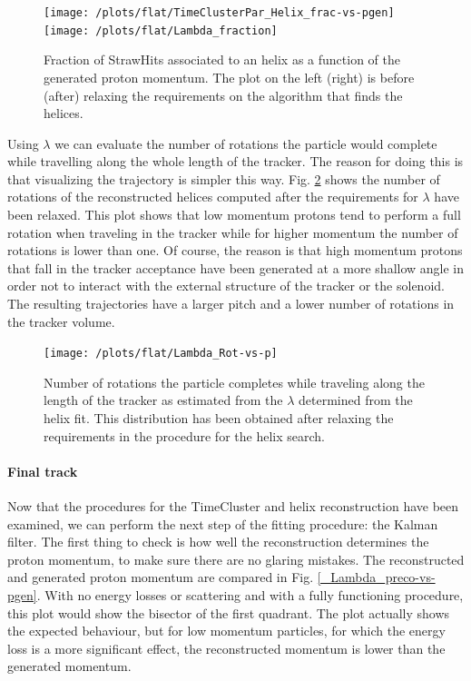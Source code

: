 \documentclass[12pt,a4paper,openright, oneside, titlepage]{book} %
\begin{document}
\begin{figure}[!htb]
\centering
\texttt{[image: /plots/flat/TimeClusterPar\_Helix\_frac-vs-pgen]}\hfill
\texttt{[image: /plots/flat/Lambda\_fraction]}
\caption[Fraction of StrawHits in a helix as a function of generated momentum]{Fraction of StrawHits associated to an helix as a function of the generated proton momentum. 
The plot on the left (right) is before (after) relaxing 
the requirements on the algorithm that finds the helices.}
\label{_active_SH_fraction}
\end{figure}

\noindent Using $\lambda$ we can evaluate the number of rotations the particle 
would complete while travelling along the whole length of the tracker. 
The reason for doing this is that visualizing the trajectory is simpler this way. 
Fig. \ref{_Lambda_Rot-vs-p} shows
the number of rotations of the reconstructed helices computed 
after the requirements for $\lambda$ have been relaxed.
This plot shows that low momentum protons tend to perform a full rotation when traveling in the tracker 
while for higher momentum the number of rotations is lower than one. 
Of course, the reason is that high momentum protons that fall in the tracker acceptance have been generated 
at a more shallow angle in order not to interact 
with the external structure of the tracker or the solenoid. 
The resulting trajectories have a larger pitch and a lower number of rotations in the tracker volume.\\

\begin{figure}[!htb]
\centering
\texttt{[image: /plots/flat/Lambda\_Rot-vs-p]}
\caption[Number or full rotation in the tracker per generated momentum]
{Number of rotations the particle completes while traveling along the length of the tracker 
as estimated from the $\lambda$ determined from the helix fit. 
This distribution has been obtained after relaxing the requirements in the procedure for the helix search.}
\label{_Lambda_Rot-vs-p}
\end{figure}

\paragraph{Final track}
Now that the procedures for the TimeCluster and helix reconstruction have been examined, 
we can perform the next step of the fitting procedure: the Kalman filter. 
The first thing to check is how well the reconstruction determines the proton momentum, 
to make sure there are no glaring mistakes. 
The reconstructed and generated proton momentum 
are compared in Fig. \ref{_Lambda_preco-vs-pgen}. 
With no energy losses or scattering and with a fully functioning procedure, 
this plot would show the bisector of the first quadrant. 
The plot actually shows the expected behaviour, 
but for low momentum particles, 
for which the energy loss is a more significant effect, 
the reconstructed momentum is lower than the generated momentum. 
\end{document}
